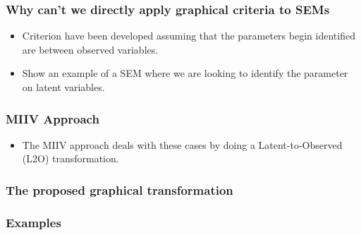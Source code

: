 \documentclass{beamer}
\begin{document}
\begin{frame}
	\frametitle{Why can't we directly apply graphical criteria to SEMs}
	\begin{itemize}
		\item Criterion have been developed assuming that the parameters 
			begin identified are between observed variables.
		\item Show an example of a SEM where we are looking to identify 
			the parameter on latent variables.
	\end{itemize}
\end{frame}

\begin{frame}
	\frametitle{MIIV Approach}
	\begin{itemize}
		\item The MIIV approach deals with these cases by doing a
			Latent-to-Observed (L2O) transformation.
	\end{itemize}
\end{frame}

\begin{frame}
	\frametitle{The proposed graphical transformation}
\end{frame}

\begin{frame}
	\frametitle{Examples}
\end{frame}
\end{document}
